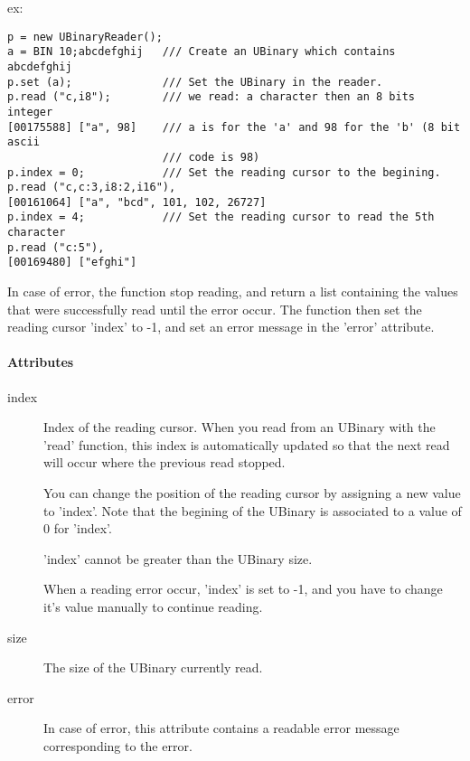 \begin{description}
  ex:


\begin{lstlisting}
p = new UBinaryReader();
a = BIN 10;abcdefghij   /// Create an UBinary which contains abcdefghij
p.set (a);              /// Set the UBinary in the reader.
p.read ("c,i8");        /// we read: a character then an 8 bits integer
[00175588] ["a", 98]    /// a is for the 'a' and 98 for the 'b' (8 bit ascii
                        /// code is 98)
p.index = 0;            /// Set the reading cursor to the begining.
p.read ("c,c:3,i8:2,i16"),
[00161064] ["a", "bcd", 101, 102, 26727]
p.index = 4;            /// Set the reading cursor to read the 5th character
p.read ("c:5"),
[00169480] ["efghi"]
\end{lstlisting}

In case of error, the function stop reading, and return a list
containing the values that were successfully read until the error
occur. The function then set the reading cursor 'index' to -{}1, and
set an error message in the 'error' attribute.

\end{description}

\paragraph{Attributes}
\label{webots.uobjects.other.ubinaryreader.attributes}%

\noindent
\begin{description}
\item[index] Index of the reading cursor. When you read from an
  UBinary with the 'read' function, this index is automatically
  updated so that the next read will occur where the previous read
  stopped.


  You can change the position of the reading cursor by assigning a new
  value to 'index'. Note that the begining of the UBinary is
  associated to a value of 0 for 'index'.


  'index' cannot be greater than the UBinary size.


  When a reading error occur, 'index' is set to -{}1, and you have to
  change it's value manually to continue reading.

\item[size] The size of the UBinary currently read.

\item[error] In case of error, this attribute contains a readable
  error message corresponding to the error.
\end{description}

